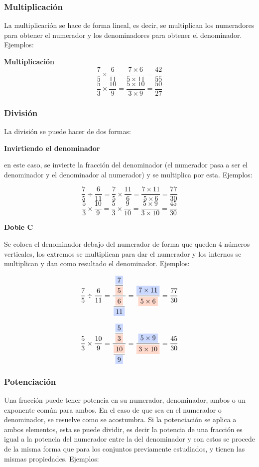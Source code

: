 \subsubsection*{Multiplicación}\label{multiplicación}
    La multiplicación se hace de forma lineal, es decir, se
    multiplican los numeradores para obtener el numerador y los denominadores
    para obtener el denominador. Ejemplos:

    \textbf{Multiplicación}
    $$\frac{7}{5} \times \frac{6}{11} = \frac{7\times6}{5\times11} =\frac{42}{55} $$
    $$\frac{5}{3} \times \frac{10}{9} = \frac{5\times10}{3\times9} =\frac{50}{27} $$

\subsubsection*{División}\label{división}
    La división se puede hacer de dos formas:

    \textbf{Invirtiendo el denominador}

    en este caso, se invierte la fracción del denominador (el numerador pasa a
    ser el denominador y el denominador al numerador) y se multiplica por esta.
    Ejemplos:

    $$\frac{7}{5}\div \frac{6}{11} = \frac{7}{5} \times \frac{11}{6} = \frac{7\times11}{5\times6} =\frac{77}{30} $$
    $$\frac{5}{3} \times \frac{10}{9} = \frac{5}{3} \times \frac{9}{10} = \frac{5\times9}{3 \times10} =\frac{45}{30} $$

    \textbf{Doble C}

    Se coloca el denominador debajo del numerador de forma que queden 4 números
    verticales, los extremos se multiplican para dar el numerador y los internos
    se multiplican y dan como resultado el denominador. Ejemplos:

    $$\frac{7}{5}\div \frac{6}{11} =
    \ddfrac{\frac{\colorbox{AzulClaro}{7}}{\colorbox{RojoClaro}{5}}}{\frac{\colorbox{RojoClaro}{6}}{\colorbox{AzulClaro}{11}}}
    =\frac{\colorbox{AzulClaro}{$7\times11$}}{\colorbox{RojoClaro}{$5\times6$}} =\frac{77}{30} $$

    $$\frac{5}{3} \times \frac{10}{9}=
    \ddfrac{\frac{\colorbox{AzulClaro}{5}}{\colorbox{RojoClaro}{3}}}{\frac{\colorbox{RojoClaro}{10}}{\colorbox{AzulClaro}{9}}}
    = \frac{\colorbox{AzulClaro}{$5\times9$}}{\colorbox{RojoClaro}{$3\times10$}} =\frac{45}{30} $$



\subsubsection*{Potenciación}\label{potenciación}
    Una fracción puede tener potencia en su numerador, denominador, ambos o un
    exponente común para ambos. En el caso de que sea en el numerador o denominador,
    se resuelve como se acostumbra.
    Si la potenciación se aplica a ambos elementos, esta se puede dividir,
    es decir la potencia
    de una fracción es igual a la potencia del numerador entre la del denominador
    y con estos se procede de la misma forma que para los conjuntos previamente
    estudiados, y tienen las mismas propiedades. Ejemplos:

